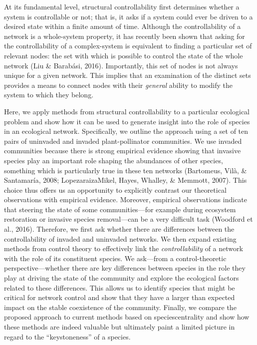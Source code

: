 \documentclass[a4paper]{artikel1}
\newcommand{\R}[1]{\label{#1}\linelabel{#1}}
\theoremstyle{definition}
\theoremstyle{definition}
\theoremstyle{definition}
\theoremstyle{remark}
\providecommand{\DIFaddtex}[1]{{\protect\color{blue}\uwave{#1}}} %
\providecommand{\DIFaddbegin}{} %
\providecommand{\DIFaddend}{} %
\providecommand{\DIFadd}[1]{\texorpdfstring{\DIFaddtex{#1}}{#1}} %
\begin{document}
At its fundamental level, structural controllability first determines
whether a system is controllable or not; that is, it asks if a system
could ever be driven to a desired state within a finite amount of time.
Although the controllability of a network is a whole-system property, it
has recently been shown that asking for the controllability of a
complex-system is equivalent to finding a particular set of relevant
nodes: the set with which is possible to control the state of the whole
network (Liu \& Barabási, 2016). Importantly, this set of nodes is not
always unique for a given network. This implies that an examination of
the distinct sets provides a means to connect nodes with their
\emph{general} ability to modify the system to which they belong.

Here, we apply methods from structural controllability to a particular
ecological problem and show how it can be used to generate insight into
the role of species in an ecological network. Specifically, we outline
the approach using a set of ten pairs of uninvaded and invaded
plant-pollinator communities. We use invaded communities because there
is strong empirical evidence showing that invasive species play an
important role shaping the abundances of other species, something which
is particularly true in these ten networks (Bartomeus, Vilà, \&
Santamaría, 2008; Lopezaraiza\textendash{}Mikel, Hayes, Whalley, \&
Memmott, 2007). This choice thus offers us an opportunity to explicitly
contrast our theoretical observations with empirical evidence. Moreover,
empirical observations indicate that steering the state of some
communities---for example during ecosystem restoration or invasive
species removal---can be a very difficult task (Woodford et al., 2016).
Therefore, we first ask whether there are differences between the
controllability of invaded and uninvaded networks. \DIFaddbegin \R{R2-ref-glossary}
\DIFaddend We then expand existing methods from control theory to effectively link
the \emph{controllability} \DIFaddbegin \DIFadd{(Table \ref{tab:tab-glossary}) }\DIFaddend of a network
with the role of its constituent species. We ask---from a
control-theoretic perspective---whether there are key differences
between species in the role they play at driving the state of the
community and explore the ecological factors related to these
differences. This allows us to identify species that might be critical
for network control and show that they have a larger than expected
impact on the stable coexistence of the community. Finally, we compare
the proposed approach to current methods based on species\DIFaddbegin \DIFadd{' }\DIFaddend centrality
and show how these methods are indeed valuable but ultimately paint a
limited picture in regard to the ``keystoneness'' of a species.
\end{document}
